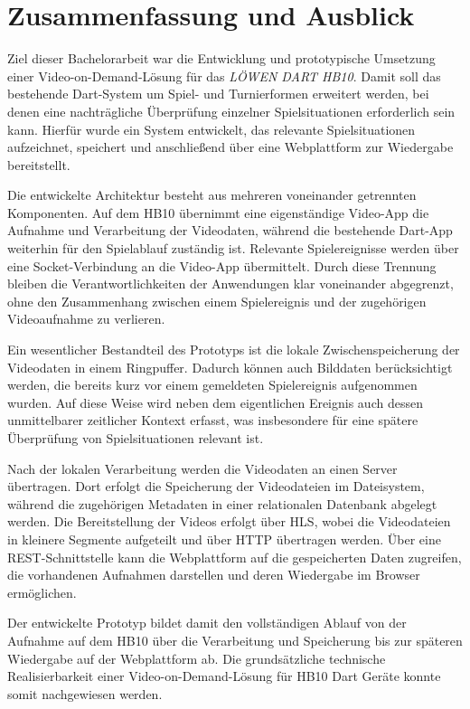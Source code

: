 \chapter{Zusammenfassung und Ausblick}  \label{cha:fazit_ausblick} 

Ziel dieser Bachelorarbeit war die Entwicklung und prototypische Umsetzung einer Video-on-Demand-Lösung für das \textit{LÖWEN DART HB10}. Damit soll das bestehende Dart-System um Spiel- und Turnierformen erweitert werden, bei denen eine nachträgliche Überprüfung einzelner Spielsituationen erforderlich sein kann. 
Hierfür wurde ein System entwickelt, das relevante Spielsituationen aufzeichnet, speichert und anschließend über eine Webplattform zur Wiedergabe bereitstellt. 

Die entwickelte Architektur besteht aus mehreren voneinander getrennten Komponenten. Auf dem HB10 übernimmt eine eigenständige Video-App die Aufnahme und Verarbeitung der Videodaten, während die bestehende Dart-App weiterhin für den Spielablauf zuständig ist. 
Relevante Spielereignisse werden über eine Socket-Verbindung an die Video-App übermittelt. Durch diese Trennung bleiben die Verantwortlichkeiten der Anwendungen klar voneinander abgegrenzt, ohne den Zusammenhang zwischen einem Spielereignis und der zugehörigen Videoaufnahme zu verlieren. 

Ein wesentlicher Bestandteil des Prototyps ist die lokale Zwischenspeicherung der Videodaten in einem Ringpuffer. Dadurch können auch Bilddaten berücksichtigt werden, die bereits kurz vor einem gemeldeten Spielereignis aufgenommen wurden. 
Auf diese Weise wird neben dem eigentlichen Ereignis auch dessen unmittelbarer zeitlicher Kontext erfasst, was insbesondere für eine spätere Überprüfung von Spielsituationen relevant ist. 

Nach der lokalen Verarbeitung werden die Videodaten an einen Server übertragen. Dort erfolgt die Speicherung der Videodateien im Dateisystem, während die zugehörigen Metadaten in einer relationalen Datenbank abgelegt werden. 
Die Bereitstellung der Videos erfolgt über HLS, wobei die Videodateien in kleinere Segmente aufgeteilt und über HTTP übertragen werden. Über eine REST-Schnittstelle kann die Webplattform auf die gespeicherten Daten zugreifen, die vorhandenen Aufnahmen darstellen und deren Wiedergabe im Browser ermöglichen. 

Der entwickelte Prototyp bildet damit den vollständigen Ablauf von der Aufnahme auf dem HB10 über die Verarbeitung und Speicherung bis zur späteren Wiedergabe auf der Webplattform ab. Die grundsätzliche technische Realisierbarkeit einer Video-on-Demand-Lösung für HB10 Dart Geräte konnte somit nachgewiesen werden. 

